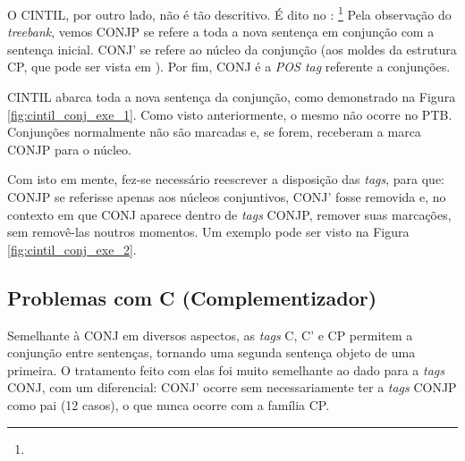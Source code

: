 \begin{center}

\end{center}
\begin{center}

\end{center}
\begin{center}

\end{center}
O CINTIL, por outro lado, não é tão descritivo. É dito no :
\footnote{}
Pela observação do \textit{treebank}, vemos CONJP se refere a toda a nova sentença em conjunção com a sentença inicial. CONJ’ se refere ao núcleo da conjunção (aos moldes da estrutura CP, que pode ser vista em ). Por fim, CONJ é a \textit{POS tag} referente a conjunções.

CINTIL abarca toda a nova sentença da conjunção, como demonstrado na Figura \ref{fig:cintil_conj_exe_1}. Como visto anteriormente, o mesmo não ocorre no PTB. Conjunções normalmente não são marcadas e, se forem, receberam a marca CONJP para o núcleo.
\begin{center}

\end{center}
Com isto em mente, fez-se necessário reescrever a disposição das \textit{tags}, para que: CONJP se referisse apenas aos núcleos conjuntivos, CONJ’ fosse removida e, no contexto em que CONJ aparece dentro de \textit{tags} CONJP, remover suas marcações, sem removê-las noutros momentos. Um exemplo pode ser visto na Figura \ref{fig:cintil_conj_exe_2}.
\begin{center}

\end{center}

\subsection{Problemas com C (Complementizador)}
\label{subsec-cintil-c}
Semelhante à CONJ em diversos aspectos, as \textit{tags} C, C’ e CP permitem a conjunção entre sentenças, tornando uma segunda sentença objeto de uma primeira. O tratamento feito com elas foi muito semelhante ao dado para a \textit{tags} CONJ, com um diferencial: CONJ’ ocorre sem necessariamente ter a \textit{tags} CONJP como pai (12 casos), o que nunca ocorre com a família CP. 

